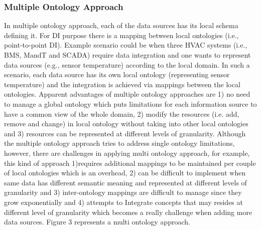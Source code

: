 \subsubsection{Multiple Ontology Approach}
In multiple ontology approach, each of the data sources has its local schema
defining it. For DI purpose there is a mapping between local ontologies (i.e.,
point-to-point DI). Example scenario could be when three HVAC systems (i.e.,
BMS, MandT and SCADA) require data integration and one wants to represent data
sources (e.g., sensor temperature) according to the local domain. In such a scenario, each data source has its own local ontology (representing sensor temperature) and the integration is achieved via mappings between the local ontologies. Apparent advantages of multiple ontology approaches are 1) no need to manage a global ontology which puts limitations for each information source to have a common view of the whole domain, 2) modify the resources (i.e. add, remove and change) in local ontology without taking into other local ontologies and 3) resources can be represented at different levels of granularity. Although the multiple ontology approach tries to address single ontology limitations, however, there are challenges in applying multi ontology approach, for example, this kind of approach 1)requires additional mappings to be maintained per couple of local ontologies which is an overhead, 2) can be difficult to implement when same data has different semantic meaning and represented at different levels of granularity and 3) inter-ontology mappings are difficult to manage since they grow exponentially and 4) attempts to Integrate concepts that may resides at different level of granularity which becomes a really challenge when adding more data sources. Figure 3 represents a multi ontology approach.
